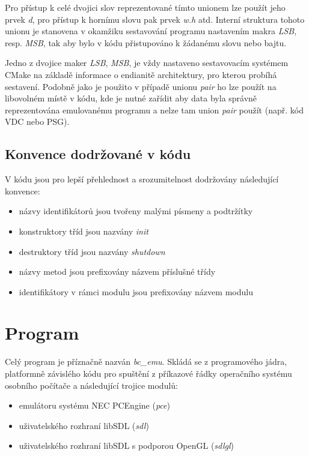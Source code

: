 Pro přístup k celé dvojici slov reprezentované tímto unionem lze použít jeho
prvek {\em d}, pro přístup k hornímu slovu pak prvek {\em w.h} atd. Interní
struktura tohoto unionu je stanovena v okamžiku sestavování programu nastavením
makra {\em LSB}, resp. {\em MSB}, tak aby bylo v kódu přistupováno k žádanému
slovu nebo bajtu.

Jedno z dvojice maker {\em LSB}, {\em MSB}, je vždy nastaveno sestavovacím
systémem CMake na základě informace o endianitě architektury, pro kterou
probíhá sestavení. Podobně jako je použito v případě unionu {\em pair} ho lze
použít na libovolném místě v kódu, kde je nutné zařídit aby data byla správně
reprezentována emulovanému programu a nelze tam union {\em pair} použít (např.
kód VDC nebo PSG).

%
%

\subsection{Konvence dodržované v kódu}

V kódu jsou pro lepší přehlednost a srozumitelnost dodržovány následující
konvence:

\begin{itemize}
\item názvy identifikátorů jsou tvořeny malými písmeny a podtržítky
\item konstruktory tříd jsou nazvány {\em init}
\item destruktory tříd jsou nazvány {\em shutdown}
\item názvy metod jsou prefixovány názvem příslušné třídy
\item identifikátory v rámci modulu jsou prefixovány názvem modulu
\end{itemize}


\section{Program}\label{chap:impl_program}

Celý program je příznačně nazván {\em bc\_emu}. Skládá se z programového jádra,
platformně závislého kódu pro spuštění z příkazové řádky operačního systému
osobního počítače a následující trojice modulů:

\begin{itemize}
\item emulátoru systému NEC PCEngine ({\em pce})
\item uživatelského rozhraní libSDL ({\em sdl})
\item uživatelského rozhraní libSDL s podporou OpenGL ({\em sdlgl})
\end{itemize}

